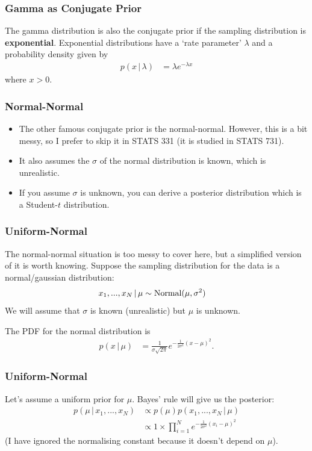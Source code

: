 \documentclass{beamer}
\newcommand{\given}{\,|\,}
\begin{document}
\begin{frame}
\frametitle{Gamma as Conjugate Prior}
The gamma distribution is also the conjugate prior if the sampling
distribution is {\bf exponential}. Exponential distributions have a
`rate parameter' $\lambda$ and a probability density given by
\begin{align}
p(x \given \lambda) &= \lambda e^{-\lambda x}
\end{align}
where $x > 0$.

\end{frame}

\begin{frame}
\frametitle{Normal-Normal}
\begin{itemize}
\item The other famous conjugate prior is the normal-normal. However, this is a bit
messy, so I prefer to skip it in STATS 331 (it is studied in STATS 731).\pause
\item It also assumes the $\sigma$ of the normal distribution is known, which
is unrealistic.\pause
\item If you assume $\sigma$ is unknown, you can derive a posterior distribution
which is a Student-$t$ distribution.
\end{itemize}

\end{frame}


\begin{frame}
\frametitle{Uniform-Normal}
The normal-normal situation is too messy to cover here, but a simplified version
of it is worth knowing. Suppose the sampling distribution for the data is
a normal/gaussian distribution:
\begin{align}
x_1, ..., x_N \given \mu &\sim \textnormal{Normal}(\mu, \sigma^2)
\end{align}
\pause
We will assume that $\sigma$ is known (unrealistic) but $\mu$ is unknown.\pause

The PDF for the normal distribution is
\begin{align}
p(x \given \mu) &= \frac{1}{\sigma\sqrt{2\pi}}e^{-\frac{1}{2\sigma^2}(x-\mu)^2}.
\end{align}

\end{frame}


\begin{frame}
\frametitle{Uniform-Normal}
Let's assume a uniform prior for $\mu$.
Bayes' rule will give us the posterior:
\begin{align}
p(\mu \given x_1, ..., x_N) &\propto p(\mu)p(x_1, ..., x_N \given \mu) \\
    &\propto 1 \times \prod_{i=1}^N e^{-\frac{1}{2\sigma^2}(x_i - \mu)^2}
\end{align}
(I have ignored the normalising constant because it doesn't depend on $\mu$).

\end{frame}
\end{document}
